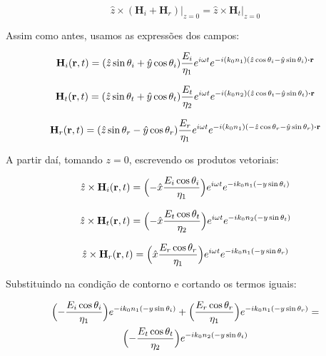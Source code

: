 \documentclass[12pt,a4paper]{report}
\begin{document}
\begin{equation}
    \hat{z}\times(\textbf{H}_i+\textbf{H}_r)\bigr|_{z=0}=\hat{z}\times\textbf{H}_t\bigr|_{z=0}
\end{equation}

Assim como antes, usamos as expressões dos campos:

\begin{equation*}
    \textbf{H}_i(\textbf{r},t)=(\hat{z}\sin\theta_i+\hat{y}\cos\theta_i)\frac{E_i}{\eta_1}e^{i\omega t}e^{-i(k_0n_1)(\hat{z}\cos\theta_i-\hat{y}\sin\theta_i)\vdot\textbf{r}}
\end{equation*}

\begin{equation*}
    \textbf{H}_t(\textbf{r},t)=(\hat{z}\sin\theta_t+\hat{y}\cos\theta_t)\frac{E_t}{\eta_2}e^{i\omega t}e^{-i(k_0n_2)(\hat{z}\cos\theta_t-\hat{y}\sin\theta_t)\vdot\textbf{r}}
\end{equation*}

\begin{equation*}
    \textbf{H}_r(\textbf{r},t)=
    (\hat{z}\sin\theta_r-\hat{y}\cos\theta_r)
    \frac{E_r}{\eta_1}
    e^{i\omega t}
        e^{
            -i(k_0n_1)(-\hat{z}\cos\theta_r-\hat{y}\sin\theta_r)
            \vdot
            \textbf{r}
          }
\end{equation*}

A partir daí, tomando $z=0$, escrevendo os produtos vetoriais:

\begin{equation*}
    \hat{z}\times\textbf{H}_i(\textbf{r},t)=\Bigl(-\hat{x}\frac{E_i\cos\theta_i}{\eta_1}\Bigr)e^{i\omega t}e^{-ik_0n_1(-y\sin\theta_i)}
\end{equation*}

\begin{equation*}
    \hat{z}\times\textbf{H}_t(\textbf{r},t)=\Bigl(-\hat{x}\frac{E_t\cos\theta_t}{\eta_2}\Bigr)e^{i\omega t}e^{-ik_0n_2(-y\sin\theta_t)}
\end{equation*}

\begin{equation*}
    \hat{z}\times\textbf{H}_r(\textbf{r},t)=\Bigl(\hat{x}\frac{E_r\cos\theta_r}{\eta_1}\Bigr)e^{i\omega t}e^{-ik_0n_1(-y\sin\theta_r)}
\end{equation*}

Substituindo na condição de contorno e cortando os termos iguais:

\begin{multline*}
    \Bigl(-\frac{E_i\cos\theta_i}{\eta_1}\Bigr)e^{-ik_0n_1(-y\sin\theta_i)}+\Bigl(\frac{E_r\cos\theta_r}{\eta_1}\Bigr)e^{-ik_0n_1(-y\sin\theta_r)}=\\\Bigl(-\frac{E_t\cos\theta_t}{\eta_2}\Bigr)e^{-ik_0n_2(-y\sin\theta_t)}
\end{multline*}
\end{document}
